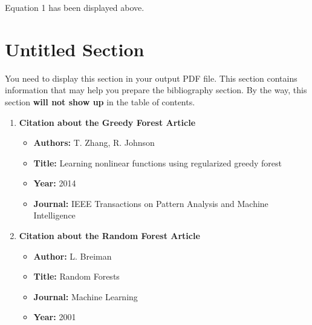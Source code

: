 \documentclass[11pt]{article}
\begin{document}
\parindent 10mm {Equation 1 has been displayed above. \cite{greedy}}

\section*{Untitled Section}
{You need to display this section in your output PDF file. This section contains information
that may help you prepare the bibliography section. By the way, this section \textbf{will not
show up} in the table of contents.
}

\begin{enumerate}
    \item \textbf{Citation about the Greedy Forest Article}
    \begin{itemize}
        \item \textbf{Authors: }T. Zhang, R. Johnson 
         \item \textbf{Title: }Learning nonlinear functions using regularized greedy forest
          \item \textbf{Year: }2014
           \item \textbf{Journal: }IEEE Transactions on Pattern Analysis and Machine Intelligence
        
    \end{itemize}
    \item \textbf{Citation about the Random Forest Article}
    \begin{itemize}
        \item \textbf{Author: }L. Breiman
         \item \textbf{Title: }Random Forests
          
           \item \textbf{Journal: } Machine Learning
           \item \textbf{Year: }2001
        
    \end{itemize}
    
     
\end{enumerate}


  
   
  
\end{document}
